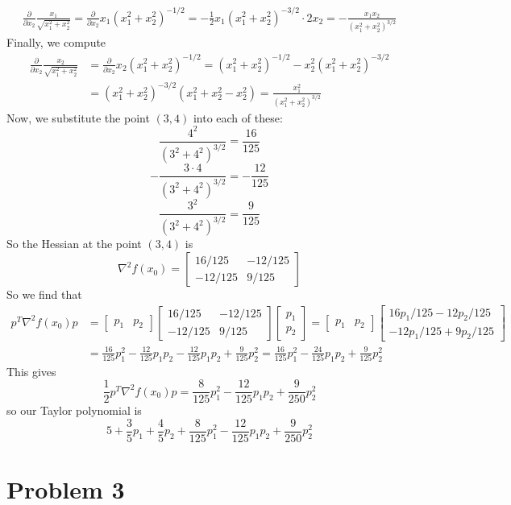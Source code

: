\documentclass[12pt]{article}
\begin{document}
\begin{align*}
\frac{\partial}{\partial x_2} \frac{x_1}{\sqrt{x_1^2+x_2^2}} = \frac{\partial}{\partial x_2} x_1(x_1^2+x_2^2)^{-1/2} = -\frac{1}{2}x_1(x_1^2+x_2^2)^{-3/2}\cdot2x_2 = -\frac{x_1x_2}{(x_1^2+x_2^2)^{3/2}}
\end{align*} Finally, we compute
\begin{align*}
\frac{\partial}{\partial x_2} \frac{x_2}{\sqrt{x_1^2+x_2^2}} &= \frac{\partial}{\partial x_2} x_2(x_1^2+x_2^2)^{-1/2} = (x_1^2+x_2^2)^{-1/2} - x_2^2(x_1^2+x_2^2)^{-3/2}\\
& = (x_1^2+x_2^2)^{-3/2}(x_1^2+x_2^2 - x_2^2) = \frac{x_1^2}{(x_1^2+x_2^2)^{3/2}}
\end{align*} Now, we substitute the point $(3,4)$ into each of these:
\[
\frac{4^2}{(3^2+4^2)^{3/2}} = \frac{16}{125}
\]
\[
-\frac{3 \cdot 4}{(3^2+4^2)^{3/2}} = -\frac{12}{125}
\]
\[
\frac{3^2}{(3^2+4^2)^{3/2}} = \frac{9}{125}
\] So the Hessian at the point $(3,4)$ is
\[
\nabla^2 f(x_0) =
\begin{bmatrix}
16/125 & -12/125\\
-12/125 & 9/125
\end{bmatrix}
\] So we find that
\begin{align*}
p^T \nabla^2 f(x_0) p & = 
\begin{bmatrix} 
p_1 & p_2
\end{bmatrix}
\begin{bmatrix}
16/125 & -12/125\\
-12/125 & 9/125
\end{bmatrix}
\begin{bmatrix}
p_1\\
p_2
\end{bmatrix}
 =
\begin{bmatrix} 
p_1 & p_2
\end{bmatrix}
\begin{bmatrix}
16p_1/125 - 12p_2/125\\
-12p_1/125 + 9p_2/125
\end{bmatrix} \\
& = \frac{16}{125}p_1^2 - \frac{12}{125}p_1p_2 - \frac{12}{125}p_1p_2 + \frac{9}{125}p_2^2 = \frac{16}{125}p_1^2 - \frac{24}{125}p_1p_2 + \frac{9}{125}p_2^2
\end{align*} This gives 
\[
\frac{1}{2} p^T \nabla^2 f(x_0) p = \frac{8}{125}p_1^2 - \frac{12}{125}p_1p_2 + \frac{9}{250}p_2^2
\] so our Taylor polynomial is 
\[
5 + \frac{3}{5}p_1 + \frac{4}{5}p_2 +  \frac{8}{125}p_1^2 - \frac{12}{125}p_1p_2 + \frac{9}{250}p_2^2
\]
\newpage
\section*{Problem 3}
\end{document}
